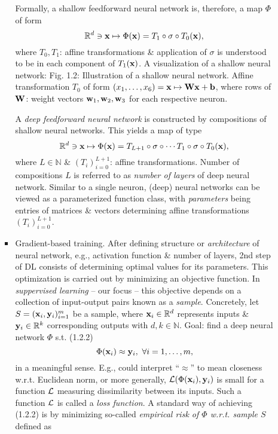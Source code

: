 \documentclass{article}
\begin{document}
\begin{itemize}
\begin{itemize}
\begin{itemize}
			Formally, a shallow feedforward neural network is, therefore, a map $\Phi$ of form
			\begin{equation}
				\label{shallow feedforward neural network}
				\mathbb{R}^d\ni{\bf x}\mapsto\Phi({\bf x}) = T_1\circ\sigma\circ T_0({\bf x}),
			\end{equation}
			where $T_0,T_1$: affine transformations \& application of $\sigma$ is understood to be in each component of $T_1({\bf x})$. A visualization of a shallow neural network: {\sf Fig. 1.2: Illustration of a shallow neural network. Affine transformation $T_0$ of form $(x_1,\ldots,x_6) = {\bf x}\mapsto{\bf W}{\bf x} + {\bf b}$, where rows of ${\bf W}$: weight vectors ${\bf w}_1,{\bf w}_2,{\bf w}_3$ for each respective neuron.}
			
			A {\it deep feedforward neural network} is constructed by compositions of shallow neural networks. This yields a map of type
			\begin{equation}
				\label{deep feedforward neural network}
				\mathbb{R}^d\ni{\bf x}\mapsto\Phi({\bf x}) = T_{L+1}\circ\sigma\circ\cdots T_1\circ\sigma\circ T_0({\bf x}),
			\end{equation}
			where $L\in\mathbb{N}$ \& $(T_i)_{i=0}^{L+1}$: affine transformations. Number of compositions $L$ is referred to as {\it number of layers} of deep neural network. Similar to a single neuron, (deep) neural networks can be viewed as a parameterized function class, with {\it parameters} being entries of matrices \& vectors determining affine transformations $(T_i)_{i=0}^{L+1}$.
			\item {\sf Gradient-based training.} After defining structure or {\it architecture} of neural network, e.g., activation function \& number of layers, 2nd step of DL consists of determining optimal values for its parameters. This optimization is carried out by minimizing an objective function. In {\it suppervised learning} -- our focus -- this objective depends on a collection of input-output pairs known as a {\it sample}. Concretely, let $S = ({\bf x}_i,{\bf y}_i)_{i=1}^m$ be a sample, where ${\bf x}_i\in\mathbb{R}^d$ represents inputs \& ${\bf y}_i\in\mathbb{R}^k$ corresponding outputs with $d,k\in\mathbb{N}$. Goal: find a deep neural network $\Phi$ s.t. (1.2.2)
			\begin{equation}
				\Phi({\bf x}_i)\approx{\bf y}_i,\ \forall i = 1,\ldots,m,
			\end{equation}
			in a meaningful sense. E.g., could interpret ``$\approx$'' to mean closeness w.r.t. Euclidean norm, or more generally, ${\cal L}(\Phi({\bf x}_i),{\bf y}_i)$ is small for a function ${\cal L}$ measuring dissimilarity between its inputs. Such a function ${\cal L}$ is called a {\it loss function}. A standard way of achieving (1.2.2) is by minimizing so-called {\it empirical risk of $\Phi$ w.r.t. sample $S$} defined as

\end{itemize}
\end{itemize}
\end{itemize}
\end{document}

